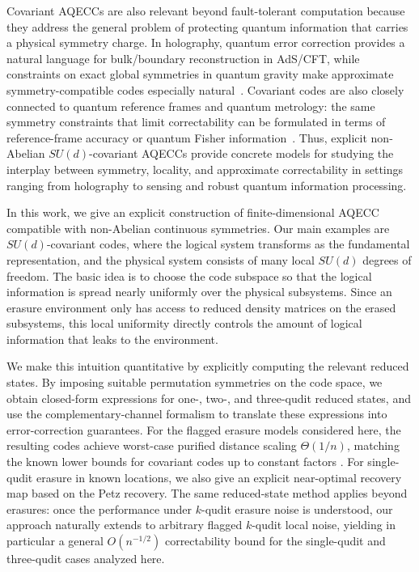 \documentclass[10pt,twocolumn,superscriptaddress,aps,amsmath,amssymb,citeautoscript,floatfix,prx,longbibliography]{revtex4-2}
\theoremstyle{plain}
\theoremstyle{plain}
\theoremstyle{plain}
\theoremstyle{plain}
\theoremstyle{plain}
\theoremstyle{plain}
\begin{document}
Covariant AQECCs are also relevant beyond fault-tolerant computation because they address the general problem of protecting quantum information that carries a physical symmetry charge. In holography, quantum error correction provides a natural language for bulk/boundary reconstruction in AdS/CFT, while constraints on exact global symmetries in quantum gravity make approximate symmetry-compatible codes especially natural~\cite{Almheiri2015,Pastawski2015,HarlowOoguri2019}. Covariant codes are also closely connected to quantum reference frames and quantum metrology: the same symmetry constraints that limit correctability can be formulated in terms of reference-frame accuracy or quantum Fisher information~\cite{Hayden2021,Woods2020,Kubica2021}. Thus, explicit non-Abelian \(SU(d)\)-covariant AQECCs provide concrete models for studying the interplay between symmetry, locality, and approximate correctability in settings ranging from holography to sensing and robust quantum information processing.

In this work, we give an explicit construction of finite-dimensional AQECC compatible with non-Abelian continuous symmetries. Our main examples are \(SU(d)\)-covariant codes, where the logical system
transforms as the fundamental representation, and the physical system consists of many local \(SU(d)\) degrees of freedom. The basic idea is to choose the code subspace so that the logical information is spread nearly uniformly over the physical subsystems. Since an erasure environment only has access to reduced density matrices on the erased subsystems, this local uniformity directly controls the amount of logical information that leaks to the environment.

We make this intuition quantitative by explicitly computing the relevant reduced states. By imposing suitable permutation symmetries on the code space, we obtain closed-form expressions for one-, two-, and three-qudit reduced states,
and use the complementary-channel formalism to translate these expressions into error-correction guarantees. For the flagged erasure models considered here, the resulting codes achieve worst-case purified distance scaling \(\Theta(1/n)\), matching the
known lower bounds for covariant codes up to constant factors
\cite{Faist2020,Zhou2021}. For single-qudit erasure in known locations, we also give an explicit near-optimal recovery map based on the Petz recovery. The same reduced-state method applies beyond erasures: once the performance under \(k\)-qudit erasure noise is understood, our approach naturally extends to arbitrary flagged \(k\)-qudit local noise, yielding in particular a general \(O(n^{-1/2})\) correctability bound for the single-qudit and three-qudit cases analyzed here.
\end{document}
